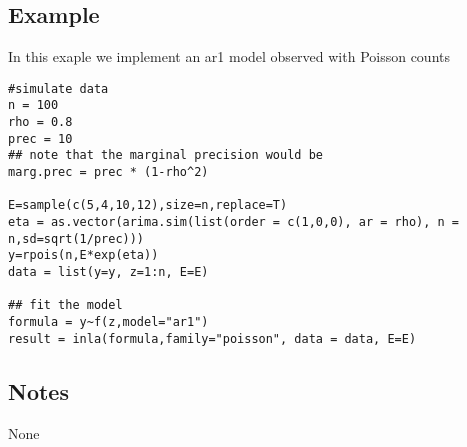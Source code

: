 \documentclass[a4paper,11pt]{article}
\begin{document}
\subsection*{Example}

In this exaple we implement an ar1 model observed with Poisson counts
\begin{verbatim}
#simulate data
n = 100
rho = 0.8
prec = 10
## note that the marginal precision would be
marg.prec = prec * (1-rho^2)

E=sample(c(5,4,10,12),size=n,replace=T)
eta = as.vector(arima.sim(list(order = c(1,0,0), ar = rho), n = n,sd=sqrt(1/prec)))
y=rpois(n,E*exp(eta))
data = list(y=y, z=1:n, E=E)

## fit the model
formula = y~f(z,model="ar1")
result = inla(formula,family="poisson", data = data, E=E)
\end{verbatim}


\subsection*{Notes}

None
\end{document}
